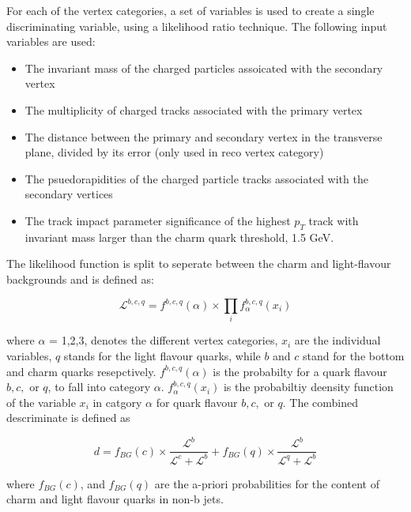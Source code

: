\par For each of the vertex categories, a set of variables is used to
create a single discriminating variable, using a likelihood ratio
technique.  The following input variables are used:
\begin{itemize}
  \item The invariant mass of the charged particles assoicated with
    the secondary vertex
  \item The multiplicity of charged tracks associated with the primary
    vertex
  \item The distance between the primary and secondary vertex in the
    transverse plane, divided by its error (only used in reco vertex category)
  \item The psuedorapidities of the charged particle tracks associated
    with the secondary vertices
  \item The track impact parameter significance of the highest $p_{T}$
    track with invariant mass larger than the charm quark threshold,
    1.5 GeV. 
\end{itemize}

\noindent The likelihood function is split to seperate between the
charm and light-flavour backgrounds and is defined as:

\begin{equation}\label{eq:csv_likelihood}
\mathcal{L}^{b,c,q} =
f^{b,c,q}(\alpha)\times\prod_{i}f_{\alpha}^{b,c,q}(x_{i})
\end{equation}

\noindent where $\alpha$ = 1,2,3, denotes the different vertex
categories, $x_{i}$ are the individual variables, $q$ stands for the
light flavour quarks, while $b$ and $c$ stand for the bottom and charm
quarks resepctively.  $f^{b,c,q}(\alpha)$ is the probabilty for a
quark flavour $b,c,$ or $q$, to fall into category $\alpha$.
$f_{\alpha}^{b,c,q}(x_{i})$ is the probabiltiy deensity
function of the variable $x_{i}$ in catgory $\alpha$ for quark flavour
$b,c,$ or $q$.  The combined descriminate is defined as

\begin{equation}\label{eq:csv_disc}
d = f_{BG}(c)\times\frac{\mathcal{L}^{b}}{\mathcal{L}^{c} +
  \mathcal{L}^{b}} + f_{BG}(q)\times\frac{\mathcal{L}^{b}}{\mathcal{L}^{q} +
  \mathcal{L}^{b}}
\end{equation}

\noindent where $f_{BG}(c)$, and $f_{BG}(q)$ are
the a-priori probabilities for the content of charm and light flavour
quarks in non-b jets.  

